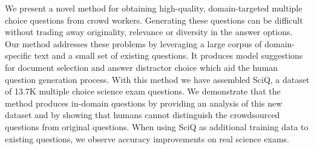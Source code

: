 We present a novel method for obtaining high-quality, domain-targeted multiple choice questions from crowd workers. Generating these questions can be difficult without trading away originality, relevance or diversity in the answer options. Our method addresses these problems by leveraging a large corpus of domain-specific text and a small set of existing questions. It produces model suggestions for document selection and answer distractor choice which aid the human question generation process. With this method we have assembled SciQ, a dataset of 13.7K multiple choice science exam questions. We demonstrate that the method produces in-domain questions by providing an analysis of this new dataset and by showing that humans cannot distinguish the crowdsourced questions from original questions. When using SciQ as additional training data to existing questions, we observe accuracy improvements on real science exams.
